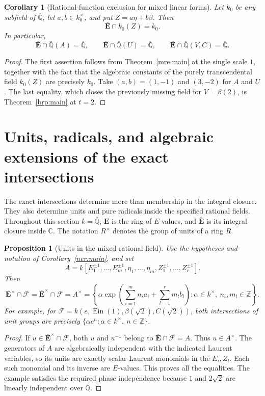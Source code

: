 \documentclass[11pt]{article}
\newtheorem{proposition}[theorem]{Proposition}
\newtheorem{corollary}[theorem]{Corollary}
\theoremstyle{definition}
\theoremstyle{remark}
\newcommand{\Qa}{\overline{\mathbb Q}}
\newcommand{\E}{\mathbf E}
\newcommand{\Ebar}{\overline{\mathbf E}}
\newcommand{\Ein}{\operatorname{Ein}}
\begin{document}
\begin{corollary}[Rational-function exclusion for mixed linear forms]
\label{etaclass:rational}
Let $k_0$ be any subfield of $\Qa$, let $a,b\in k_0^\times$, and put
$Z=a\eta+b\beta$. Then
\[
 \Ebar\cap k_0(Z)=k_0.
\]
In particular,
\[
 \Ebar\cap\Qa(A)=\Qa,\qquad
 \Ebar\cap\Qa(U)=\Qa,\qquad
 \Ebar\cap\Qa(V,C)=\Qa.
\]
\end{corollary}
\begin{proof}
The first assertion follows from Theorem~\ref{mre:main} at the
single scale $1$, together with the fact that the algebraic
constants of the purely transcendental field $k_0(Z)$ are precisely
$k_0$.  Take $(a,b)=(1,-1)$ and $(3,-2)$ for $A$ and $U$.
The last equality, which closes the previously missing field for
$V=\beta(2)$, is Theorem~\ref{brp:main} at $t=2$.
\end{proof}


\section{Units, radicals, and algebraic extensions of the exact intersections}
\label{unit:section}

The exact intersections determine more than membership in the integral
closure. They also determine units and pure radicals inside the specified
rational fields. Throughout this section $k=\overline{\mathbb Q}$,
$\E$ is the ring of $E$-values, and $\Ebar$ is its integral closure
inside $\mathbb C$. The notation $R^\times$ denotes the group of units
of a ring $R$.

\begin{proposition}[Units in the mixed rational field]\label{unit:mixed}
Use the hypotheses and notation of Corollary~\ref{ncr:main}, and set
\[
 A=k[E_1^{\pm1},\ldots,E_m^{\pm1},\eta_1,\ldots,\eta_m,
                                      Z_1^{\pm1},\ldots,Z_r^{\pm1}].
\]
Then
\begin{equation}\label{unit:mixed-equality}
 \E^\times\cap\mathcal F
 =\Ebar^\times\cap\mathcal F
 =A^\times
 =\left\{\alpha\exp\!\left(\sum_{i=1}^m n_i a_i+
                         \sum_{l=1}^r m_l b_l\right):
       \alpha\in k^\times,\ n_i,m_l\in\mathbb Z\right\}.
\end{equation}
For example, for $\mathcal F=k(e,\Ein(1),\beta(\sqrt2),C(\sqrt2))$,
both intersections of unit groups are precisely
$\{\alpha e^n:\alpha\in k^\times,\ n\in\mathbb Z\}$.
\end{proposition}
\begin{proof}
If $u\in\Ebar^\times\cap\mathcal F$, both $u$ and $u^{-1}$
belong to $\Ebar\cap\mathcal F=A$. Thus $u\in A^\times$.
The generators of $A$ are algebraically independent with the indicated
Laurent variables, so its units are exactly scalar Laurent monomials in
the $E_i,Z_l$. Each such monomial and its inverse are $E$-values.
This proves all the equalities. The example satisfies the required phase
independence because $1$ and $2\sqrt2$ are linearly independent over
$\mathbb Q$.
\end{proof}
\end{document}
